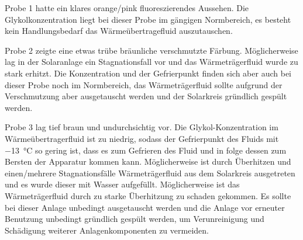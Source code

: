 Probe 1 hatte ein klares orange/pink fluoreszierendes Aussehen. Die Glykolkonzentration liegt bei dieser Probe im gängigen Normbereich, es besteht kein Handlungsbedarf das Wärmeübertragefluid auszutauschen. 

Probe 2 zeigte eine etwas trübe bräunliche verschmutzte Färbung. Möglicherweise lag in der Solaranlage ein Stagnationsfall vor und das Wärmeträgerfluid wurde zu stark erhitzt. Die Konzentration und der Gefrierpunkt finden sich aber auch bei dieser Probe noch im Normbereich, das Wärmeträgerfluid sollte aufgrund der Verschmutzung aber ausgetauscht werden und der Solarkreis gründlich gespült werden.  

Probe 3 lag tief braun und undurchsichtig vor.  Die Glykol-Konzentration im Wärmeübertragerfluid ist zu niedrig, sodass der Gefrierpunkt des Fluids mit \SI{-13}{\celsius} so gering ist, dass es zum Gefrieren des Fluid und in folge dessen zum Bersten der Apparatur kommen kann. Möglicherweise ist durch Überhitzen und einen/mehrere Stagnationsfälle Wärmeträgerfluid aus dem Solarkreis ausgetreten und es wurde dieser mit Wasser aufgefüllt. Möglicherweise ist das Wärmeträgerfluid durch zu starke Überhitzung zu schaden gekommen. Es sollte bei dieser Anlage unbedingt ausgetauscht werden und die Anlage vor erneuter Benutzung unbedingt gründlich gespült werden, um Verunreinigung und Schädigung weiterer Anlagenkomponenten zu vermeiden. 